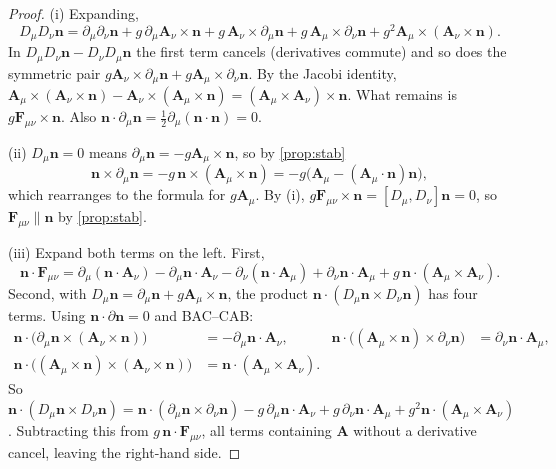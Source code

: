 \begin{proof}
(i) Expanding,
\[
D_\mu D_\nu\mathbf n=\partial_\mu\partial_\nu\mathbf n+g\,\partial_\mu\mathbf A_\nu\times\mathbf n+g\,\mathbf A_\nu\times\partial_\mu\mathbf n+g\,\mathbf A_\mu\times\partial_\nu\mathbf n+g^2\mathbf A_\mu\times(\mathbf A_\nu\times\mathbf n).
\]
In $D_\mu D_\nu\mathbf n-D_\nu D_\mu\mathbf n$ the first term cancels (derivatives commute) and so does the symmetric pair $g\mathbf A_\nu\times\partial_\mu\mathbf n+g\mathbf A_\mu\times\partial_\nu\mathbf n$. By the Jacobi identity, $\mathbf A_\mu\times(\mathbf A_\nu\times\mathbf n)-\mathbf A_\nu\times(\mathbf A_\mu\times\mathbf n)=(\mathbf A_\mu\times\mathbf A_\nu)\times\mathbf n$. What remains is $g\mathbf F_{\mu\nu}\times\mathbf n$. Also $\mathbf n\cdot\partial_\mu\mathbf n=\frac12\partial_\mu(\mathbf n\cdot\mathbf n)=0$.

(ii) $D_\mu\mathbf n=0$ means $\partial_\mu\mathbf n=-g\mathbf A_\mu\times\mathbf n$, so by \cref{prop:stab}
\[
\mathbf n\times\partial_\mu\mathbf n=-g\,\mathbf n\times(\mathbf A_\mu\times\mathbf n)=-g\bigl(\mathbf A_\mu-(\mathbf A_\mu\cdot\mathbf n)\mathbf n\bigr),
\]
which rearranges to the formula for $g\mathbf A_\mu$. By (i), $g\mathbf F_{\mu\nu}\times\mathbf n=[D_\mu,D_\nu]\mathbf n=0$, so $\mathbf F_{\mu\nu}\parallel\mathbf n$ by \cref{prop:stab}.

(iii) Expand both terms on the left. First,
\[
\mathbf n\cdot\mathbf F_{\mu\nu}=\partial_\mu(\mathbf n\cdot\mathbf A_\nu)-\partial_\mu\mathbf n\cdot\mathbf A_\nu-\partial_\nu(\mathbf n\cdot\mathbf A_\mu)+\partial_\nu\mathbf n\cdot\mathbf A_\mu+g\,\mathbf n\cdot(\mathbf A_\mu\times\mathbf A_\nu).
\]
Second, with $D_\mu\mathbf n=\partial_\mu\mathbf n+g\mathbf A_\mu\times\mathbf n$, the product $\mathbf n\cdot(D_\mu\mathbf n\times D_\nu\mathbf n)$ has four terms. Using $\mathbf n\cdot\partial\mathbf n=0$ and BAC--CAB:
\begin{align*}
\mathbf n\cdot\bigl(\partial_\mu\mathbf n\times(\mathbf A_\nu\times\mathbf n)\bigr)&=-\partial_\mu\mathbf n\cdot\mathbf A_\nu, &
\mathbf n\cdot\bigl((\mathbf A_\mu\times\mathbf n)\times\partial_\nu\mathbf n\bigr)&=\partial_\nu\mathbf n\cdot\mathbf A_\mu,\\
\mathbf n\cdot\bigl((\mathbf A_\mu\times\mathbf n)\times(\mathbf A_\nu\times\mathbf n)\bigr)&=\mathbf n\cdot(\mathbf A_\mu\times\mathbf A_\nu).
\end{align*}
So $\mathbf n\cdot(D_\mu\mathbf n\times D_\nu\mathbf n)=\mathbf n\cdot(\partial_\mu\mathbf n\times\partial_\nu\mathbf n)-g\,\partial_\mu\mathbf n\cdot\mathbf A_\nu+g\,\partial_\nu\mathbf n\cdot\mathbf A_\mu+g^2\mathbf n\cdot(\mathbf A_\mu\times\mathbf A_\nu)$. Subtracting this from $g\,\mathbf n\cdot\mathbf F_{\mu\nu}$, all terms containing $\mathbf A$ without a derivative cancel, leaving the right-hand side.
\end{proof}


